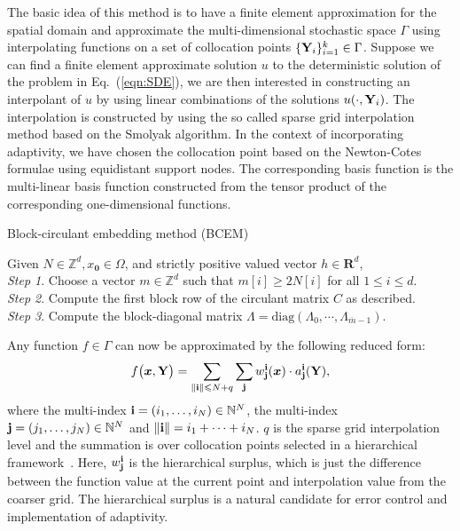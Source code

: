 \documentclass[article,authoryear,jfv]{beg_32}             %
\begin{document}
The basic idea of this method is to have a finite element
approximation for the spatial domain and approximate the
multi-dimensional stochastic space $\Gamma$ using interpolating
functions on a set of collocation points $\{\bold{Y}_i\}_{i=1}^k \in
\Gamma$.  Suppose we can find a finite element approximate solution
$u$ to the deterministic solution of the problem in
Eq.~(\ref{eqn:SDE}), we are then interested in constructing an
interpolant of $u$ by using linear combinations of the solutions
$u(\cdot,\bold{Y}_i)$. The interpolation is constructed by using the
so called sparse grid interpolation method based on the Smolyak
algorithm. In the context of incorporating adaptivity, we have
chosen the collocation point based on the Newton-Cotes formulae
using equidistant support nodes. The corresponding basis function is
the multi-linear basis function constructed from the tensor product
of the corresponding one-dimensional functions.

\begin{algorithm}[!t]
	\caption{Block-circulant embedding method (BCEM)}
	\label{alg:bcem}
Given $N\in \mathbb{Z}^d, x_\textbf{0}\in \Omega$, and strictly positive valued vector $h \in \mathbf{R}^d$,\\
	 	\textit{Step 1}. Choose a vector $m\in \mathbb{Z}^d$ such that $m[i] \geq 2 N[i]$ for all $1 \leq i \leq d$. \label{step01}\\
		\textit{Step 2}.  Compute the first block row of the circulant matrix $C$ as described. \label{step02}\\
		\textit{Step 3}.  Compute the block-diagonal matrix $\Lambda = \mathrm{diag}(\Lambda_0, \cdots,\Lambda_{\overline{m}-1})$. \label{step03}
\end{algorithm}



Any function $f \in \Gamma$ can now be approximated by the following
reduced form:
\begin{equation}
 f\big(\mbox{\boldmath $x$},\bold{Y}\big ) = \sum _{\|{\bf i}\|\leqslant N+q} \sum_{\bold {j}}
w_{\bf j}^{\bf i}(\mbox{\boldmath $x$}) \cdot a_{\bf j}^{\bf
i}(\bold{Y}), \label{eqn:approximate}
\end{equation}
\noindent
where the multi-index $\bold{i} = (i_1,\ldots,i_N)\in \mathbb{N}^N $, the multi-index $\bold{j} = (j_1,\ldots,j_N)\in \mathbb{N}^N$ and
$\|\bold{i}\| = i_1+\cdots+i_N$. $q$ is the sparse grid
interpolation level and the summation is over collocation points
selected in a hierarchical framework~\cite{Xiang,dol04mul}. Here, $w_{\bf
j}^{\bf i}$ is the hierarchical surplus, which is just the
difference between the function value at the current point and
interpolation value from the coarser grid. The hierarchical surplus
is a natural candidate for error control and implementation of
adaptivity.
\end{document}
